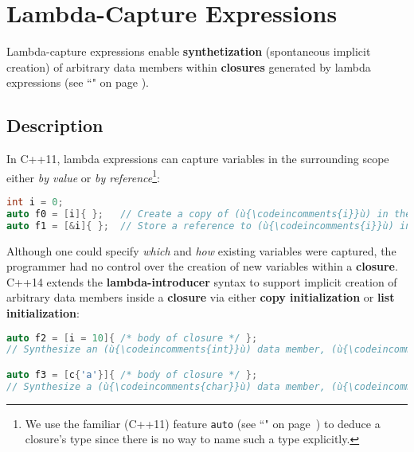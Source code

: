 \newpage
\section[Lambda-Capture Expressions]{Lambda-Capture Expressions}\label{lambda-capture-expressions}


Lambda-capture expressions enable \textbf{synthetization} (spontaneous implicit creation) of
arbitrary data members within \textbf{closures} generated by
lambda expressions (see ``" on page \pageref{lambda}).

\subsection[Description]{Description}\label{description}

In C++11, lambda expressions can capture variables in the
surrounding scope either \emph{by value} or \emph{by reference}{\cprotect\footnote{We use the familiar (C++11) feature
\texttt{auto} (see ``" on page~\pageref{auto-feature}) to deduce a closure's type since there is no
way to name such a type explicitly.}}:

\begin{lstlisting}[language=C++]
int i = 0;
auto f0 = [i]{ };   // Create a copy of (ù{\codeincomments{i}}ù) in the generated closure named (ù{\codeincomments{f0}}ù).
auto f1 = [&i]{ };  // Store a reference to (ù{\codeincomments{i}}ù) in the generated closure named (ù{\codeincomments{f1}}ù).
\end{lstlisting}

\noindent Although one could specify \emph{which} and \emph{how} existing
variables were captured, the programmer had no control over the creation
of new variables within a \textbf{closure}. C++14 extends the
\textbf{lambda-introducer} syntax to support implicit creation of
arbitrary data members inside a \textbf{closure} via either \textbf{copy
initialization} or \textbf{list initialization}:

\begin{lstlisting}[language=C++]
auto f2 = [i = 10]{ /* body of closure */ };
// Synthesize an (ù{\codeincomments{int}}ù) data member, (ù{\codeincomments{i}}ù), initialized with (ù{\codeincomments{10}}ù) in the closure.

auto f3 = [c{'a'}]{ /* body of closure */ };
// Synthesize a (ù{\codeincomments{char}}ù) data member, (ù{\codeincomments{c}}ù), initialized with (ù{\codeincomments{'a'}}ù) in the closure.
\end{lstlisting}

